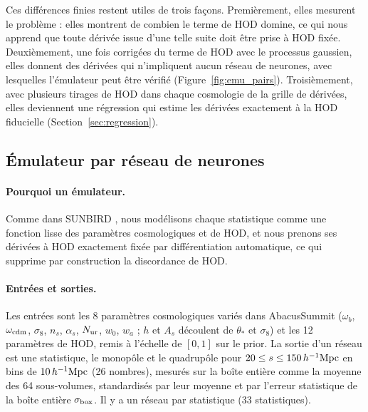Ces différences finies restent utiles de trois façons. Premièrement, elles mesurent le problème : elles montrent de combien le terme de HOD domine, ce qui nous apprend que toute dérivée issue d'une telle suite doit être prise à HOD fixée. Deuxièmement, une fois corrigées du terme de HOD avec le processus gaussien, elles donnent des dérivées qui n'impliquent aucun réseau de neurones, avec lesquelles l'émulateur peut être vérifié (Figure~\ref{fig:emu_pairs}). Troisièmement, avec plusieurs tirages de HOD dans chaque cosmologie de la grille de dérivées, elles deviennent une régression qui estime les dérivées exactement à la HOD fiducielle (Section~\ref{sec:regression}).

\subsection{Émulateur par réseau de neurones}
\label{sec:emulator}

\paragraph{Pourquoi un émulateur.} Comme dans SUNBIRD \cite{CuestaLazaro2024}, nous modélisons chaque statistique comme une fonction lisse des paramètres cosmologiques et de HOD, et nous prenons ses dérivées à HOD exactement fixée par différentiation automatique, ce qui supprime par construction la discordance de HOD.

\paragraph{Entrées et sorties.} Les entrées sont les 8 paramètres cosmologiques variés dans AbacusSummit ($\omega_b$, $\omega_{\rm cdm}$, $\sigma_8$, $n_s$, $\alpha_s$, $N_{\rm ur}$, $w_0$, $w_a$ ; $h$ et $A_s$ découlent de $\theta_*$ et $\sigma_8$) et les 12 paramètres de HOD, remis à l'échelle de $[0,1]$ sur le prior. La sortie d'un réseau est une statistique, le monopôle et le quadrupôle pour $20\le s\le150\,h^{-1}\mathrm{Mpc}$ en bins de $10\,h^{-1}\mathrm{Mpc}$ (26 nombres), mesurés sur la boîte entière comme la moyenne des 64 sous-volumes, standardisés par leur moyenne et par l'erreur statistique de la boîte entière $\sigma_{\rm box}$. Il y a un réseau par statistique (33 statistiques).


